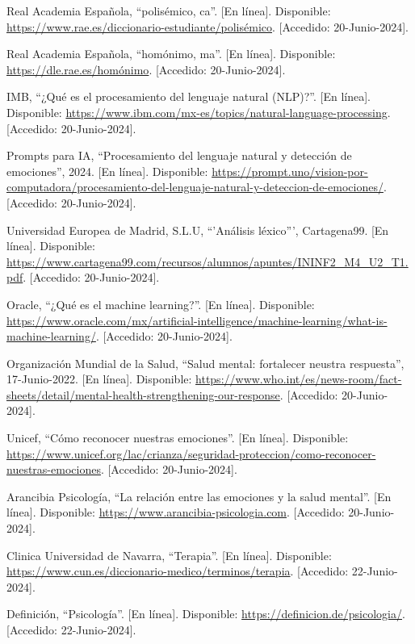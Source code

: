 \documentclass[12pt,twoside]{article}
\begin{document}
\begin{thebibliography}{10}
	Real Academia Española, ``polisémico, ca''. [En línea]. Disponible: \url{https://www.rae.es/diccionario-estudiante/polisémico}. [Accedido: 20-Junio-2024].
	
	Real Academia Española, ``homónimo, ma''. [En línea]. Disponible: \url{https://dle.rae.es/homónimo}. [Accedido: 20-Junio-2024].
	
	IMB, ``¿Qué es el procesamiento del lenguaje natural (NLP)?''. [En línea]. Disponible: \url{https://www.ibm.com/mx-es/topics/natural-language-processing}. [Accedido: 20-Junio-2024].
	
	Prompts para IA, ``Procesamiento del lenguaje natural y detección de emociones'', 2024. [En línea]. Disponible: \url{https://prompt.uno/vision-por-computadora/procesamiento-del-lenguaje-natural-y-deteccion-de-emociones/}. [Accedido: 20-Junio-2024].
	
	Universidad Europea de Madrid, S.L.U, ``'Análisis léxico''', Cartagena99. [En línea]. Disponible: \url{https://www.cartagena99.com/recursos/alumnos/apuntes/ININF2_M4_U2_T1.pdf}. [Accedido: 20-Junio-2024].
	
	Oracle, ``¿Qué es el machine learning?''. [En línea]. Disponible: \url{https://www.oracle.com/mx/artificial-intelligence/machine-learning/what-is-machine-learning/}. [Accedido: 20-Junio-2024].
	
	Organización Mundial de la Salud, ``Salud mental: fortalecer neustra respuesta'', 17-Junio-2022. [En línea]. Disponible: \url{https://www.who.int/es/news-room/fact-sheets/detail/mental-health-strengthening-our-response}. [Accedido: 20-Junio-2024].
	
	Unicef, ``Cómo reconocer nuestras emociones''. [En línea]. Disponible: \url{https://www.unicef.org/lac/crianza/seguridad-proteccion/como-reconocer-nuestras-emociones}. [Accedido: 20-Junio-2024].
	
	Arancibia Psicología, ``La relación entre las emociones y la salud mental''. [En línea]. Disponible: \url{https://www.arancibia-psicologia.com}. [Accedido: 20-Junio-2024].
	
	Clinica Universidad de Navarra, ``Terapia''. [En línea]. Disponible: \url{https://www.cun.es/diccionario-medico/terminos/terapia}. [Accedido: 22-Junio-2024].
	
	Definición, ``Psicología''. [En línea]. Disponible: \url{https://definicion.de/psicologia/}. [Accedido: 22-Junio-2024].
	

\end{thebibliography}
\end{document}
